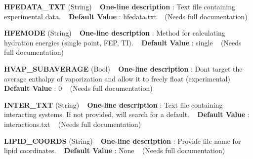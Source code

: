 \begin{DoxyItemize}
\item {\bfseries  H\+F\+E\+D\+A\+T\+A\+\_\+\+T\+XT } (String) ~\newline
{\bfseries  One-\/line description }\+: Text file containing experimental data. ~\newline
{\bfseries  Default Value }\+: hfedata.\+txt ~\newline
(Needs full documentation)\end{DoxyItemize}
\begin{DoxyItemize}
\item {\bfseries  H\+F\+E\+M\+O\+DE } (String) ~\newline
{\bfseries  One-\/line description }\+: Method for calculating hydration energies (single point, F\+EP, TI). ~\newline
{\bfseries  Default Value }\+: single ~\newline
(Needs full documentation)\end{DoxyItemize}
\begin{DoxyItemize}
\item {\bfseries  H\+V\+A\+P\+\_\+\+S\+U\+B\+A\+V\+E\+R\+A\+GE } (Bool) ~\newline
{\bfseries  One-\/line description }\+: Don\textquotesingle{}t target the average enthalpy of vaporization and allow it to freely float (experimental) ~\newline
{\bfseries  Default Value }\+: 0 ~\newline
(Needs full documentation)\end{DoxyItemize}
\begin{DoxyItemize}
\item {\bfseries  I\+N\+T\+E\+R\+\_\+\+T\+XT } (String) ~\newline
{\bfseries  One-\/line description }\+: Text file containing interacting systems. If not provided, will search for a default. ~\newline
{\bfseries  Default Value }\+: interactions.\+txt ~\newline
(Needs full documentation)\end{DoxyItemize}
\begin{DoxyItemize}
\item {\bfseries  L\+I\+P\+I\+D\+\_\+\+C\+O\+O\+R\+DS } (String) ~\newline
{\bfseries  One-\/line description }\+: Provide file name for lipid coordinates. ~\newline
{\bfseries  Default Value }\+: None ~\newline
(Needs full documentation)\end{DoxyItemize}
